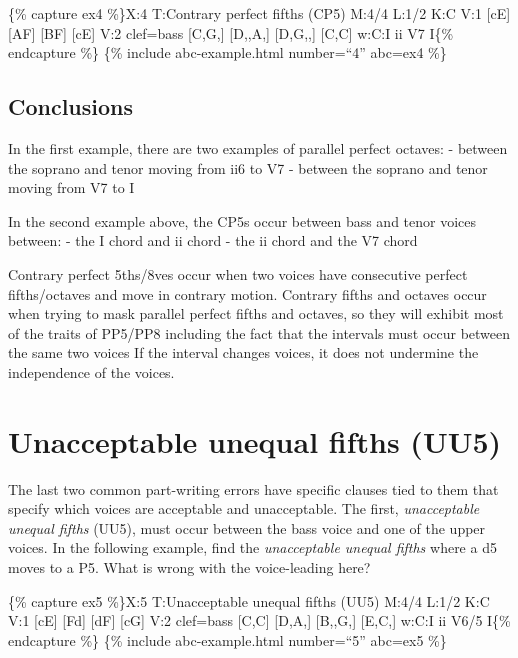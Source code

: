 \documentclass{book}
\begin{document}
\{\% capture ex4 \%\}X:4 T:Contrary perfect fifths (CP5) M:4/4 L:1/2 K:C V:1
{[}cE{]} {[}AF{]}\textbar{} {[}BF{]} {[}cE{]}\textbar{]} V:2 clef=bass
{[}C,G,{]} {[}D,,A,{]} \textbar{} {[}D,G,,{]} {[}C,C{]}\textbar{]} w:C:I ii V7
I\{\% endcapture \%\} \{\% include abc-example.html number=``4'' abc=ex4 \%\}

\hypertarget{conclusions-44}{%
\subsection{Conclusions}\label{conclusions-44}}

In the first example, there are two examples of parallel perfect octaves: -
between the soprano and tenor moving from ii6 to V7 - between the soprano and
tenor moving from V7 to I

In the second example above, the CP5s occur between bass and tenor voices
between: - the I chord and ii chord - the ii chord and the V7 chord

Contrary perfect 5ths/8ves occur when two voices have consecutive perfect
fifths/octaves and move in contrary motion. Contrary fifths and octaves occur
when trying to mask parallel perfect fifths and octaves, so they will exhibit
most of the traits of PP5/PP8 including the fact that the intervals must occur
between the same two voices If the interval changes voices, it does not
undermine the independence of the voices.

\hypertarget{unacceptable-unequal-fifths-uu5}{%
\section{Unacceptable unequal fifths
(UU5)}\label{unacceptable-unequal-fifths-uu5}}

The last two common part-writing errors have specific clauses tied to them
that specify which voices are acceptable and unacceptable. The first,
\emph{unacceptable unequal fifths} (UU5), must occur between the bass voice
and one of the upper voices. In the following example, find the
\emph{unacceptable unequal fifths} where a d5 moves to a P5. What is wrong
with the voice-leading here?

\{\% capture ex5 \%\}X:5 T:Unacceptable unequal fifths (UU5) M:4/4 L:1/2 K:C
V:1 {[}cE{]} {[}Fd{]}\textbar{} {[}dF{]} {[}cG{]}\textbar{]} V:2 clef=bass
{[}C,C{]} {[}D,A,{]} \textbar{} {[}B,,G,{]} {[}E,C,{]}\textbar{]} w:C:I ii
V6/5 I\{\% endcapture \%\} \{\% include abc-example.html number=``5'' abc=ex5
\%\}
\end{document}
